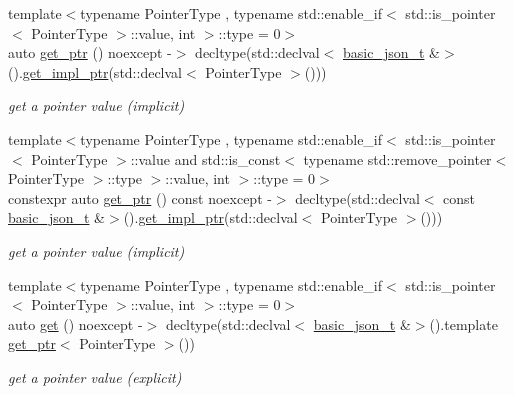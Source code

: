 \begin{DoxyCompactItemize}
\item 
{\footnotesize template$<$typename Pointer\+Type , typename std\+::enable\+\_\+if$<$ std\+::is\+\_\+pointer$<$ Pointer\+Type $>$\+::value, int $>$\+::type  = 0$>$ }\\auto \mbox{\hyperlink{classnlohmann_1_1basic__json_afb283ec92e108f9561a86427a609b87c}{get\+\_\+ptr}} () noexcept -\/$>$ decltype(std\+::declval$<$ \mbox{\hyperlink{classnlohmann_1_1basic__json_afff7860310ae69f29f8158a77ec0ef13}{basic\+\_\+json\+\_\+t}} \&$>$().\mbox{\hyperlink{classnlohmann_1_1basic__json_a58b65f595883fb93333423ec5e3bafee}{get\+\_\+impl\+\_\+ptr}}(std\+::declval$<$ Pointer\+Type $>$()))
\begin{DoxyCompactList}\small\item\em get a pointer value (implicit) \end{DoxyCompactList}\item 
{\footnotesize template$<$typename Pointer\+Type , typename std\+::enable\+\_\+if$<$ std\+::is\+\_\+pointer$<$ Pointer\+Type $>$\+::value and std\+::is\+\_\+const$<$ typename std\+::remove\+\_\+pointer$<$ Pointer\+Type $>$\+::type $>$\+::value, int $>$\+::type  = 0$>$ }\\constexpr auto \mbox{\hyperlink{classnlohmann_1_1basic__json_adc3f060acf24d0902aeed7dadec66a7d}{get\+\_\+ptr}} () const noexcept -\/$>$ decltype(std\+::declval$<$ const \mbox{\hyperlink{classnlohmann_1_1basic__json_afff7860310ae69f29f8158a77ec0ef13}{basic\+\_\+json\+\_\+t}} \&$>$().\mbox{\hyperlink{classnlohmann_1_1basic__json_a58b65f595883fb93333423ec5e3bafee}{get\+\_\+impl\+\_\+ptr}}(std\+::declval$<$ Pointer\+Type $>$()))
\begin{DoxyCompactList}\small\item\em get a pointer value (implicit) \end{DoxyCompactList}\item 
{\footnotesize template$<$typename Pointer\+Type , typename std\+::enable\+\_\+if$<$ std\+::is\+\_\+pointer$<$ Pointer\+Type $>$\+::value, int $>$\+::type  = 0$>$ }\\auto \mbox{\hyperlink{classnlohmann_1_1basic__json_a4e8c9b67704826384d417cfd4b18a7bb}{get}} () noexcept -\/$>$ decltype(std\+::declval$<$ \mbox{\hyperlink{classnlohmann_1_1basic__json_afff7860310ae69f29f8158a77ec0ef13}{basic\+\_\+json\+\_\+t}} \&$>$().template \mbox{\hyperlink{classnlohmann_1_1basic__json_afb283ec92e108f9561a86427a609b87c}{get\+\_\+ptr}}$<$ Pointer\+Type $>$())
\begin{DoxyCompactList}\small\item\em get a pointer value (explicit) \end{DoxyCompactList}\item 

\end{DoxyCompactItemize}
